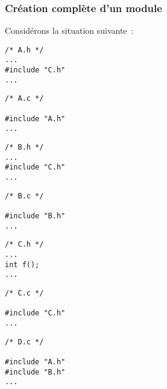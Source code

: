 \begin{frame}[fragile]
\frametitle{Création complète d'un module}
Considérons la situation suivante~:
\bigskip

\begin{minipage}[c]{.22\textwidth}
\begin{lstlisting}[frame=single,numbers=none]
/* A.h */
...
#include "C.h"
...
\end{lstlisting}
\end{minipage}
\enspace
\begin{minipage}[c]{.22\textwidth}
\begin{lstlisting}[frame=single,numbers=none]
/* A.c */

#include "A.h"
...
\end{lstlisting}
\end{minipage}
\quad
\begin{minipage}[c]{.22\textwidth}
\begin{lstlisting}[frame=single,numbers=none]
/* B.h */
...
#include "C.h"
...
\end{lstlisting}
\end{minipage}
\enspace
\begin{minipage}[c]{.22\textwidth}
\begin{lstlisting}[frame=single,numbers=none]
/* B.c */

#include "B.h"
...
\end{lstlisting}
\end{minipage}
\medskip

\begin{minipage}[c]{.22\textwidth}
\begin{lstlisting}[frame=single,numbers=none]
/* C.h */
...
int f();
...
\end{lstlisting}
\end{minipage}
\enspace
\begin{minipage}[c]{.22\textwidth}
\begin{lstlisting}[frame=single,numbers=none]
/* C.c */

#include "C.h"
...
\end{lstlisting}
\end{minipage}
\qquad \qquad
\begin{minipage}[c]{.22\textwidth}
\begin{lstlisting}[frame=single,numbers=none]
/* D.c */

#include "A.h"
#include "B.h"
...
\end{lstlisting}
\end{minipage}
\end{frame}

